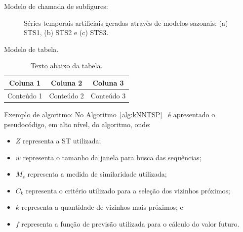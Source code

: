 Modelo de chamada de subfigures:
\begin{figure}[!htb]
\centering
{}
\caption[Séries temporais artificiais geradas através de modelos sazonais]{Séries temporais artificiais geradas através de modelos sazonais: (a) STS1, (b) STS2 e (c) STS3.}
\label{fig:SeriesA}
\end{figure}


Modelo de tabela.
\begin{table}[!htb]
	\centering	
	\label{tab:tab_exemplo}
\begin{tabular}{|c|c|c|}
\hline 
Coluna 1 & Coluna 2 & Coluna 3 \\ 
\hline 
Conteúdo 1 & Conteúdo 2 & Conteúdo 3 \\ 
\hline 
\end{tabular} 
\caption[Texto da lista de tabelas]{Texto abaixo da tabela.}
\end{table}

Exemplo de algoritmo:
No Algoritmo~\ref{alg:kNNTSP}~\cite{Ferrero2009} é apresentado o pseudocódigo, em alto nível, do algoritmo, onde:
\begin{itemize}
\item $Z$ representa a ST utilizada;
\item $w$ representa o tamanho da janela para busca das sequências;
\item $M_s$ representa a medida de similaridade utilizada;
\item $C_k$ representa o critério utilizado para a seleção dos vizinhos próximos;
\item $k$ representa a quantidade de vizinhos mais próximos; e
\item $f$ representa a função de previsão utilizada para o cálculo do valor futuro.
\end{itemize}

